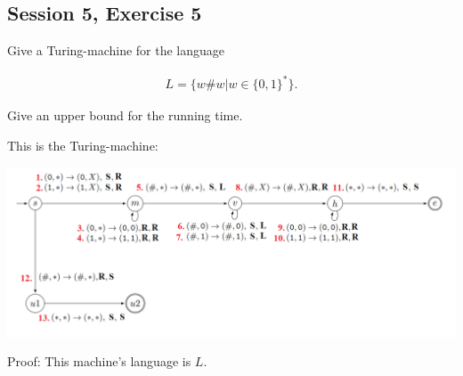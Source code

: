 \subsection {Session 5, Exercise 5}

\label{6_5}


Give a Turing-machine for the language

\begin{align*}
 L = \{w\#w | w \in{} \{0,1\}^*\}.
\end{align*}

Give an upper bound for the running time.


This is the Turing-machine:

\includegraphics[width=\linewidth]{05/6_5.png}

Proof: This machine's language is $L$.

